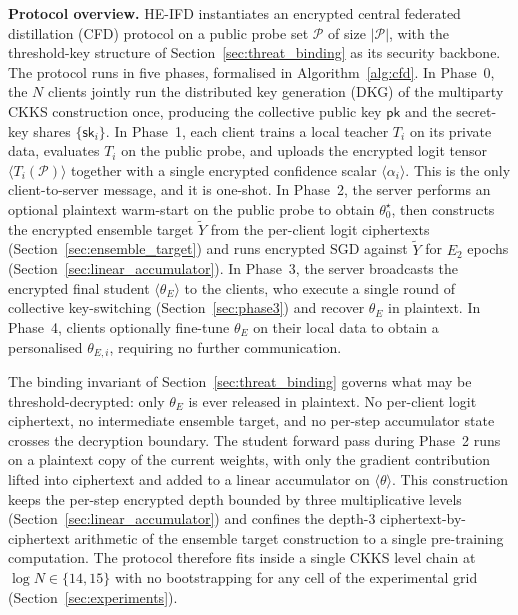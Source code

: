 \par\noindent\textbf{Protocol overview.} HE-IFD instantiates an encrypted central federated distillation (CFD) protocol on a public probe set $\mathcal P$ of size $|\mathcal P|$, with the threshold-key structure of Section~\ref{sec:threat_binding} as its security backbone. The protocol runs in five phases, formalised in Algorithm~\ref{alg:cfd}. In Phase~0, the $N$ clients jointly run the distributed key generation (DKG) of the multiparty CKKS construction once, producing the collective public key $\mathsf{pk}$ and the secret-key shares $\{\mathsf{sk}_i\}$. In Phase~1, each client trains a local teacher $T_i$ on its private data, evaluates $T_i$ on the public probe, and uploads the encrypted logit tensor $\langle T_i(\mathcal P)\rangle$ together with a single encrypted confidence scalar $\langle\alpha_i\rangle$. This is the only client-to-server message, and it is one-shot. In Phase~2, the server performs an optional plaintext warm-start on the public probe to obtain $\theta_0^\star$, then constructs the encrypted ensemble target $\widetilde Y$ from the per-client logit ciphertexts (Section~\ref{sec:ensemble_target}) and runs encrypted SGD against $\widetilde Y$ for $E_2$ epochs (Section~\ref{sec:linear_accumulator}). In Phase~3, the server broadcasts the encrypted final student $\langle\theta_E\rangle$ to the clients, who execute a single round of collective key-switching (Section~\ref{sec:phase3}) and recover $\theta_E$ in plaintext. In Phase~4, clients optionally fine-tune $\theta_E$ on their local data to obtain a personalised $\theta_{E,i}$, requiring no further communication.

The binding invariant of Section~\ref{sec:threat_binding} governs what may be threshold-decrypted: only $\theta_E$ is ever released in plaintext. No per-client logit ciphertext, no intermediate ensemble target, and no per-step accumulator state crosses the decryption boundary. The student forward pass during Phase~2 runs on a plaintext copy of the current weights, with only the gradient contribution lifted into ciphertext and added to a linear accumulator on $\langle\theta\rangle$. This construction keeps the per-step encrypted depth bounded by three multiplicative levels (Section~\ref{sec:linear_accumulator}) and confines the depth-3 ciphertext-by-ciphertext arithmetic of the ensemble target construction to a single pre-training computation. The protocol therefore fits inside a single CKKS level chain at $\log N \in \{14, 15\}$ with no bootstrapping for any cell of the experimental grid (Section~\ref{sec:experiments}).

